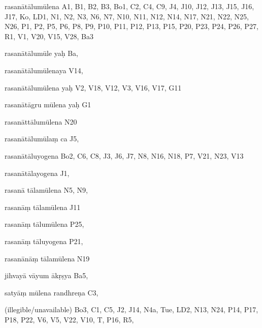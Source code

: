 \begin{marma}[hp02_009]
\begin{marma}[hp02_011]
 \begin{marma}[hp02_57a]
\item[rasanātālumūlena] A1, B1, B2, B3, Bo1, C2, C4, C9, J4, J10, J12, J13, J15, J16, J17, Ko, LD1, N1, N2, N3, N6, N7, N10, N11, N12, N14, N17, N21, N22, N25, N26, P1, P2, P5, P6, P8, P9, P10, P11, P12, P13, P15, P20, P23, P24, P26, P27, R1, V1, V20, V15, V28, Ba3
\item[rasanātālumūle yaḥ] Ba,
\item[rasanātālumūlenaya] V14,
\item[rasanātālumūlena yaḥ] V2, V18, V12, V3, V16, V17, G11
\item[rasanātāgru mūlena yaḥ] G1
\item[rasanāttālumūlena] N20
\item[rasanātālumūlaṃ ca] J5, 
\item[rasanātāluyogena] Bo2, C6, C8, J3, J6, J7, N8, N16, N18, P7, V21, N23, V13
\item[rasanātālayogena] J1,
\item[rasanā tālamūlena] N5, N9, 
\item[rasanāṃ tālamūlena] J11
\item[rasanāṃ tālumūlena] P25,
\item[rasanāṃ tāluyogena] P21, 
\item[rasanānāṃ tālamūlena] N19
\item[jihvayā vāyum ākṛṣya] Ba5,
\item[satyāṃ mūlena randhreṇa] C3,
\item[]
\item[(illegible/unavailable)] Bo3, C1, C5, J2, J14, N4a, Tue, LD2, N13, N24, P14, P17, P18, P22, V6, V5, V22, V10, T, P16, R5,
  \begin{description}

    \end{description}
 \end{marma}


\end{marma}
\end{marma}
